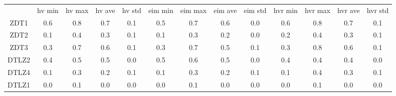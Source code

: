 \begin{tabular}{ccccccccccccc}
\hline
& hv min & hv max & hv ave & hv std & eim min & eim max & eim ave & eim std & hvr min & hvr max & hvr ave & hvr std \\
ZDT1 & 0.6 & 0.8 & 0.7 & 0.1 & 0.5 & 0.7 & 0.6 & 0.0 & 0.6 & 0.8 & 0.7 & 0.1 \\
ZDT2 & 0.1 & 0.4 & 0.3 & 0.1 & 0.1 & 0.3 & 0.2 & 0.0 & 0.2 & 0.4 & 0.3 & 0.1 \\
ZDT3 & 0.3 & 0.7 & 0.6 & 0.1 & 0.3 & 0.7 & 0.5 & 0.1 & 0.3 & 0.8 & 0.6 & 0.1 \\
DTLZ2 & 0.4 & 0.5 & 0.5 & 0.0 & 0.5 & 0.6 & 0.5 & 0.0 & 0.4 & 0.4 & 0.4 & 0.0 \\
DTLZ4 & 0.1 & 0.3 & 0.2 & 0.1 & 0.1 & 0.3 & 0.2 & 0.1 & 0.1 & 0.4 & 0.3 & 0.1 \\
DTLZ1 & 0.0 & 0.1 & 0.0 & 0.0 & 0.0 & 0.1 & 0.0 & 0.0 & 0.0 & 0.1 & 0.0 & 0.0 \\
\hline
\end{tabular}
